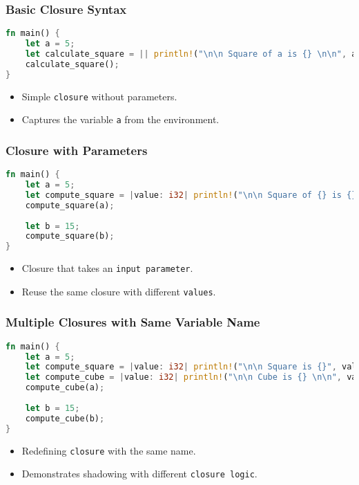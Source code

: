 \documentclass[aspectratio=169, table]{beamer}
\begin{document}
\begin{frame}[fragile]
\frametitle{Basic Closure Syntax}
\begin{lstlisting}[language=Rust]
fn main() {
	let a = 5;
	let calculate_square = || println!("\n\n Square of a is {} \n\n", a * a);
	calculate_square();
}
\end{lstlisting}
\begin{itemize}
\item Simple \texttt{closure} without parameters.
\item Captures the variable \texttt{a} from the environment.
\end{itemize}
\end{frame}

\begin{frame}[fragile]
\frametitle{Closure with Parameters}
\begin{lstlisting}[language=Rust]
fn main() {
	let a = 5;
	let compute_square = |value: i32| println!("\n\n Square of {} is {} \n\n", value, value * value);
	compute_square(a);
	
	let b = 15;
	compute_square(b);
}
\end{lstlisting}
\begin{itemize}
\item Closure that takes an \texttt{input\ parameter}.
\item Reuse the same closure with different \texttt{values}.
\end{itemize}
\end{frame}

\begin{frame}[fragile]
\frametitle{Multiple Closures with Same Variable Name}
\vspace{15pt}
\begin{lstlisting}[language=Rust]
fn main() {
	let a = 5;
	let compute_square = |value: i32| println!("\n\n Square is {}", value * value);
	let compute_cube = |value: i32| println!("\n\n Cube is {} \n\n", value * value * value);
	compute_cube(a);
	
	let b = 15;
	compute_cube(b);
}
\end{lstlisting}
\begin{itemize}
\item Redefining \texttt{closure} with the same name.
\item Demonstrates shadowing with different \texttt{closure\ logic}.
\end{itemize}
\end{frame}
\end{document}
